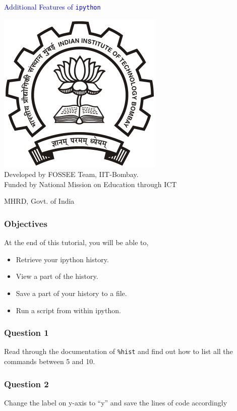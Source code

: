 \documentclass[presentation]{beamer}
\title{}
\author{FOSSEE}
\date{}
\begin{document}
\begin{frame}

\begin{center}
\textcolor{blue}{Additional Features of  \texttt{ipython}}
\end{center}
\begin{center}
\includegraphics[scale=0.25]{../images/iitb-logo.png}\\
Developed by FOSSEE Team, IIT-Bombay. \\ 
Funded by National Mission on Education through ICT

MHRD, Govt. of India
\end{center}
\end{frame}
\begin{frame}
\frametitle{Objectives}
\label{sec-2}

  At the end of this tutorial, you will be able to,
 

\begin{itemize}
\item Retrieve your ipython history.
\item View a part of the history.
\item Save a part of your history to a file.
\item Run a script from within ipython.
\end{itemize}
\end{frame}
\begin{frame}
\frametitle{Question 1}
\label{sec-3}

  Read through the documentation of \texttt{\%hist} and find out how to
  list all the commands between 5 and 10.
\end{frame}
\begin{frame}
\frametitle{Question 2}
\label{sec-4}

  Change the label on y-axis to ``y'' and save the lines of code
  accordingly
\end{frame}
\end{document}
